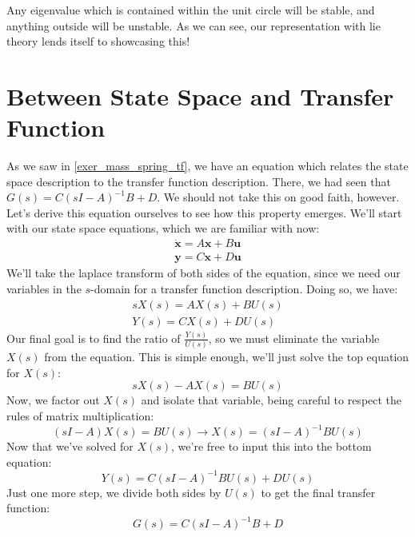 Any eigenvalue which is contained within the unit circle will be stable, and anything outside will be unstable. As we can see, our representation with \gls{lie theory} lends itself to showcasing this!

\section{Between State Space and Transfer Function}

As we saw in \autoref{exer_mass_spring_tf}, we have an equation which relates the state space description to the transfer function description. There, we had seen that $G(s)=C(sI-A)^{-1}B+D$. We should not take this on good faith, however. Let's derive this equation ourselves to see how this property emerges. We'll start with our state space equations, which we are familiar with now:
\begin{gather}
    \bm{\dot{x}}=A\bm{x}+B\bm{u}\\
    \bm{y}=C\bm{x}+D\bm{u}
\end{gather}
We'll take the \gls{laplace transform} of both sides of the equation, since we need our variables in the $s$-domain for a transfer function description. Doing so, we have:
\begin{gather}
sX(s)=AX(s)+BU(s)\\
    Y(s)=CX(s)+DU(s)
\end{gather}
Our final goal is to find the ratio of $\frac{Y(s)}{U(s)}$, so we must eliminate the variable $X(s)$ from the equation. This is simple enough, we'll just solve the top equation for $X(s)$:
$$sX(s)-AX(s)=BU(s)$$
Now, we factor out $X(s)$ and isolate that variable, being careful to respect the rules of matrix multiplication:
$$\left(sI-A\right)X(s)=BU(s)\rightarrow X(s)=(sI-A)^{-1}BU(s)$$
Now that we've solved for $X(s)$, we're free to input this into the bottom equation:
$$Y(s)=C(sI-A)^{-1}BU(s)+DU(s)$$
Just one more step, we divide both sides by $U(s)$ to get the final transfer function:
$$G(s)=C(sI-A)^{-1}B+D$$
